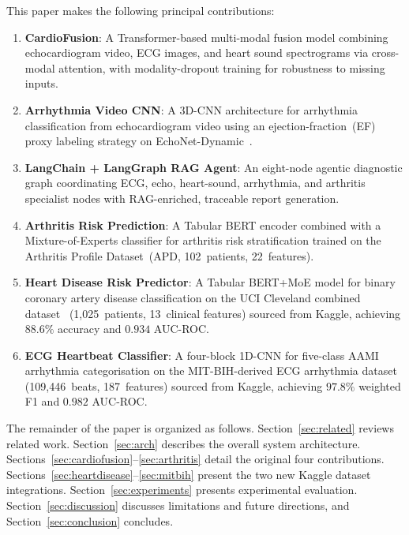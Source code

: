 \documentclass[journal,10pt,twoside]{IEEEtran}
\begin{document}
This paper makes the following principal contributions:
\begin{enumerate}
  \item \textbf{CardioFusion}: A Transformer-based multi-modal fusion model combining
        echocardiogram video, ECG images, and heart sound spectrograms via cross-modal
        attention, with modality-dropout training for robustness to missing inputs.
  \item \textbf{Arrhythmia Video CNN}: A 3D-CNN architecture for arrhythmia
        classification from echocardiogram video using an ejection-fraction~(EF) proxy
        labeling strategy on EchoNet-Dynamic~\cite{ouyang2020}.
  \item \textbf{LangChain + LangGraph RAG Agent}: An eight-node agentic diagnostic
        graph coordinating ECG, echo, heart-sound, arrhythmia, and arthritis specialist
        nodes with RAG-enriched, traceable report generation.
  \item \textbf{Arthritis Risk Prediction}: A Tabular BERT encoder combined with a
        Mixture-of-Experts classifier for arthritis risk stratification trained on the
        Arthritis Profile Dataset~(APD, 102~patients, 22~features).
  \item \textbf{Heart Disease Risk Predictor}: A Tabular BERT+MoE model for binary
        coronary artery disease classification on the UCI Cleveland combined
        dataset~\cite{uci_heart} (1{,}025~patients, 13~clinical features)
        sourced from Kaggle, achieving $88.6\%$ accuracy and $0.934$ AUC-ROC.
  \item \textbf{ECG Heartbeat Classifier}: A four-block 1D-CNN for five-class AAMI
        arrhythmia categorisation on the MIT-BIH-derived ECG arrhythmia
        dataset~\cite{moody2001,sadmansakib2021} (109{,}446~beats, 187~features)
        sourced from Kaggle, achieving $97.8\%$ weighted F1 and $0.982$ AUC-ROC.
\end{enumerate}

The remainder of the paper is organized as follows.
Section~\ref{sec:related} reviews related work.
Section~\ref{sec:arch} describes the overall system architecture.
Sections~\ref{sec:cardiofusion}--\ref{sec:arthritis} detail the original four contributions.
Sections~\ref{sec:heartdisease}--\ref{sec:mitbih} present the two new Kaggle dataset integrations.
Section~\ref{sec:experiments} presents experimental evaluation.
Section~\ref{sec:discussion} discusses limitations and future directions, and
Section~\ref{sec:conclusion} concludes.
\end{document}
